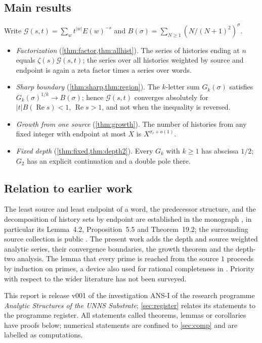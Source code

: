 \documentclass[11pt,a4paper]{article}
\begin{document}
\subsection*{Main results}
Write $\mathcal G(s,t)=\sum_wt^{|w|}E(w)^{-s}$ and $B(\sigma)=\sum_{N\ge1}(N/(N+1)^2)^{\sigma}$.
\begin{itemize}
\item \emph{Factorization} (\cref{thm:factor,thm:allhist}). The series of histories ending at $n$ equals
$\zeta(s)\mathcal G(s,t)$; the series over all histories weighted by source and endpoint is again a zeta factor
times a series over words.
\item \emph{Sharp boundary} (\cref{thm:sharp,thm:region}). The $k$-letter sum $G_k(\sigma)$ satisfies
$G_k(\sigma)^{1/k}\to B(\sigma)$; hence $\mathcal G(s,t)$ converges absolutely for $|t|B(\operatorname{Re}s)<1$,
$\operatorname{Re}s>1$, and not when the inequality is reversed.
\item \emph{Growth from one source} (\cref{thm:growth}). The number of histories from any fixed integer with
endpoint at most $X$ is $X^{\sigma_c+o(1)}$.
\item \emph{Fixed depth} (\cref{thm:fixed,thm:depth2}). Every $G_k$ with $k\ge1$ has abscissa $1/2$; $G_2$ has
an explicit continuation and a double pole there.
\end{itemize}

\subsection*{Relation to earlier work}
The least source and least endpoint of a word, the predecessor structure, and the decomposition of history sets
by endpoint are established in the monograph \cite{monograph}, in particular its Lemma~4.2, Proposition~5.5 and
Theorem~19.2; the surrounding source collection is public \cite{sources,index}. The present work adds the depth
and source weighted analytic series, their convergence boundaries, the growth theorem and the depth-two
analysis. The lemma that every prime is reached from the source $1$ proceeds by induction on primes, a device
also used for rational completeness in \cite{algebraic}. Priority with respect to the wider literature has not
been surveyed.

This report is release v001 of the investigation ANS-I of the research programme \emph{Analytic Structures of
the UNNS Substrate}; \cref{sec:register} relates its statements to the programme register. All statements called
theorems, lemmas or corollaries have proofs below; numerical statements are confined to \cref{sec:comp} and are
labelled as computations.
\end{document}
